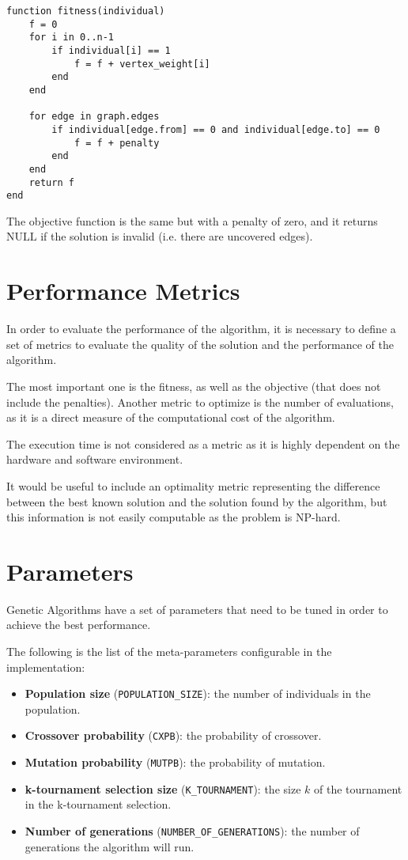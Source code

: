 \begin{framed}
\begin{lstlisting}[caption=Fitness function]
function fitness(individual)
	f = 0
	for i in 0..n-1
		if individual[i] == 1
			f = f + vertex_weight[i]
		end
	end

	for edge in graph.edges
		if individual[edge.from] == 0 and individual[edge.to] == 0
			f = f + penalty
		end
	end
	return f
end
\end{lstlisting}
\end{framed}

The objective function is the same but with a penalty of zero, and it returns $\text{NULL}$ if the solution is invalid (i.e. there are uncovered edges).



\section{Performance Metrics}

In order to evaluate the performance of the algorithm, it is necessary to define a set of metrics to evaluate the quality of the solution and the performance of the algorithm.

The most important one is the fitness, as well as the objective (that does not include the penalties). Another metric to optimize is the number of evaluations, as it is a direct measure of the computational cost of the algorithm.

The execution time is not considered as a metric as it is highly dependent on the hardware and software environment.

It would be useful to include an optimality metric representing the difference between the best known solution and the solution found by the algorithm, but this information is not easily computable as the problem is NP-hard.

\section{Parameters}

Genetic Algorithms have a set of parameters that need to be tuned in order to achieve the best performance.

The following is the list of the meta-parameters configurable in the implementation:

\begin{itemize}
	\item \textbf{Population size} (\texttt{POPULATION\_SIZE}): the number of individuals in the population.
	\item \textbf{Crossover probability} (\texttt{CXPB}): the probability of crossover.
	\item \textbf{Mutation probability} (\texttt{MUTPB}): the probability of mutation.
	\item \textbf{k-tournament selection size} (\texttt{K\_TOURNAMENT}): the size $k$ of the tournament in the k-tournament selection.
	\item \textbf{Number of generations} (\texttt{NUMBER\_OF\_GENERATIONS}): the number of generations the algorithm will run.
\end{itemize}

